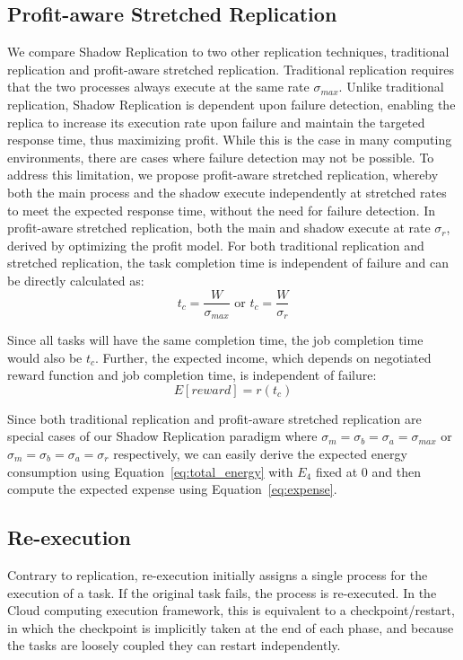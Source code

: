 \subsection{Profit-aware Stretched Replication}
We compare Shadow Replication to two other replication techniques,
traditional replication and profit-aware stretched replication.
Traditional replication requires that the two processes always execute
at the same rate $\sigma_{max}$. Unlike traditional replication,
Shadow Replication is dependent upon failure detection, enabling the
replica to increase its execution rate upon failure and maintain the
targeted response time, thus maximizing profit. While this is the case
in many computing environments, there are cases where failure
detection may not be possible. To address this limitation, we propose
profit-aware stretched replication, whereby both the main process and
the shadow execute independently at stretched rates to meet the
expected response time, without the need for failure
detection. In profit-aware stretched replication, both the main and
shadow execute at rate $\sigma_r$, derived by optimizing the profit
model.  For both traditional replication and stretched replication,
the task completion time is independent of failure and can be directly
calculated as:
\begin{equation}
t_c=\frac{W}{\sigma_{max}} \text{ or } t_c=\frac{W}{\sigma_r}
\end{equation}

Since all tasks will have the same completion time, the job completion
time would also be $t_c$. Further, the expected income, which depends
on negotiated reward function and job completion time, is independent
of failure:
\begin{equation}
E[reward]=r(t_c)
\end{equation}

Since both traditional replication and profit-aware stretched
replication are special cases of our Shadow Replication paradigm where
$\sigma_m=\sigma_b=\sigma_a=\sigma_{max}$ or
$\sigma_m=\sigma_b=\sigma_a=\sigma_r$ respectively, we can easily derive the
expected energy consumption using Equation~\ref{eq:total_energy} with $E_4$
fixed at 0 and then compute the expected expense using Equation~\ref{eq:expense}.

\subsection{Re-execution} 
Contrary to replication, re-execution initially assigns a single
process for the execution of a task. If the original task fails, the
process is re-executed. In the Cloud computing execution framework,
this is equivalent to a checkpoint/restart, in which the checkpoint is
implicitly taken at the end of each phase, and because the tasks are
loosely coupled they can restart independently. 

